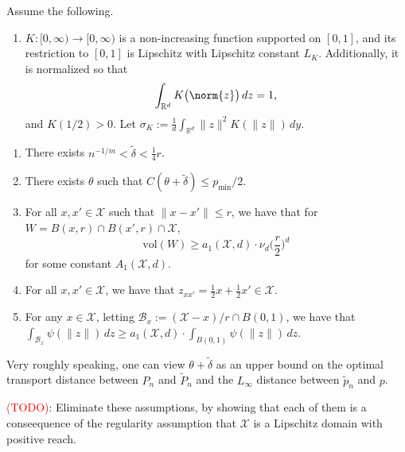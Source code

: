 \documentclass{article}
\newcommand{\Reals}{\mathbb{R}}
\newcommand{\vol}{\text{vol}}
\newcommand{\1}{\mathbf{1}}
\newcommand{\Xset}{\mathcal{X}}
\newcommand{\Leb}{L}
\newcommand{\mc}[1]{\mathcal{#1}}
\newcommand{\wt}[1]{\widetilde{#1}}
\theoremstyle{alden}
\theoremstyle{aldenthm}
\theoremstyle{definition}
\theoremstyle{remark}
\begin{document}
Assume the following.
\begin{enumerate}[label=(K\arabic*)]
	\item
	\label{asmp:kernel}
	$K:[0,\infty) \to [0,\infty)$ is a non-increasing function supported on $[0,1]$, and its restriction to $[0,1]$ is Lipschitz with Lipschitz constant $L_K$. Additionally, it is normalized so that
	\begin{equation*}
	\int_{\Reals^d} K\bigl(\norm{z}\bigr) \,dz = 1,
	\end{equation*}
	and $K(1/2) > 0$. Let $\sigma_{K} := \frac{1}{d}\int_{\Reals^d} \|z\|^2 K(\|z\|) \,dy$.
\end{enumerate}
\begin{enumerate}[label=(OT\arabic*)]
	\item 
	\label{asmp:calder19_1}
	There exists $n^{-1/m} < \wt{\delta} < \frac{1}{4}r$.
	\item 
	\label{asmp:calder19_2} There exists $\theta$ such that $C(\theta + \wt{\delta}) \leq p_{\min}/2$.
	\item
	\label{asmp:r_small_1} For all $x,x' \in \Xset$ such that $\|x - x'\| \leq r$, we have that for $W = B(x,r) \cap B(x',r) \cap \Xset$,
	\begin{equation*}
	\vol(W) \geq a_1(\Xset,d) \cdot \nu_d \biggl(\frac{r}{2}\biggr)^d
	\end{equation*}
	for some constant $A_1(\Xset,d)$. 
	\item
	\label{asmp:r_small_2} For all $x,x' \in \Xset$, we have that $z_{xx'} = \frac{1}{2}x + \frac{1}{2}x' \in \Xset$.
	\item 
	\label{asmp:r_small_3} For any $x \in \Xset$, letting $\mc{B}_x:= (\Xset - x)/r \cap B(0,1)$, we have that $\int_{\mc{B}_x} \psi(\|z\|) \,dz \geq a_1(\Xset,d) \cdot \int_{B(0,1)} \psi(\|z\|) \,dz$.
\end{enumerate}
Very roughly speaking, one can view $\theta + \wt{\delta}$ as an upper bound on the optimal transport distance between $P_n$ and $\wt{P}_n$ and the $\Leb_{\infty}$ distance between $\wt{p}_n$ and $p$. 

\textcolor{red}{(TODO)}: Eliminate these assumptions, by showing that each of them is a conseequence of the regularity assumption that $\Xset$ is a Lipschitz domain with positive reach.
\end{document}
